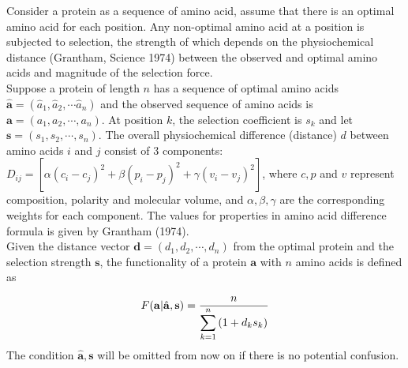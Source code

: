 \documentclass[13pt]{article}
\begin{document}
Consider a protein as a sequence of amino acid, assume that there is an optimal amino acid for each position. Any non-optimal amino acid at a position is subjected to selection, the strength of which depends on the physiochemical distance (Grantham, Science 1974) between the observed and optimal amino acids and magnitude of the selection force. \\

Suppose a protein of length $n$ has a sequence of optimal amino acids $\hat{\mathbf{a}} = (\hat{a}_1, \hat{a}_2, \cdots \hat{a}_n)$  and the observed sequence of amino acids is $\mathbf{a} = (a_1, a_2, \cdots, a_n)$. At position $k$, the selection coefficient is $s_k$ and let $\mathbf{s}=(s_1,s_2,\cdots,s_n)$. The overall physiochemical difference (distance) $d$ between amino acids $i$ and $j$ consist of 3 components: $D_{ij} = [\alpha (c_i-c_j)^2 + \beta (p_i - p_j)^2 + \gamma (v_i - v_j)^2]$, where $c, p$ and $v$ represent composition, polarity and molecular volume, and $\alpha, \beta, \gamma$ are the corresponding weights for each component. The values for properties in amino acid difference formula is given by Grantham (1974). \\

Given the distance vector $\mathbf{d} = (d_1, d_2, \cdots, d_n)$ from the optimal protein and the selection strength $\mathbf{s}$, the functionality of a protein $\mathbf{a}$ with $n$ amino acids is defined as

\begin{equation}
F(\mathbf{a}| \hat{\mathbf{a}},\mathbf{s})  =  \frac{n}{\displaystyle  \sum_{k=1}^n{(1+d_ks_k)}} \label{eq:harmonic}\\
\end{equation}
The condition $\hat{\mathbf{a}},\mathbf{s}$ will be omitted from now on if there is no potential confusion.\\
\end{document}
